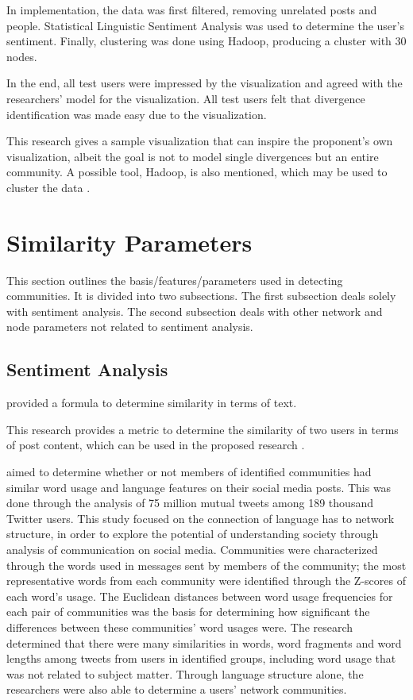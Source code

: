 In implementation, the data was first filtered, removing unrelated posts and people. Statistical Linguistic Sentiment Analysis was used to determine the user’s sentiment. Finally, clustering was done using Hadoop, producing a cluster with 30 nodes. 

In the end, all test users were impressed by the visualization and agreed with the researchers’ model for the visualization. All test users felt that divergence identification was made easy due to the visualization. 

This research gives a sample visualization that can inspire the proponent’s own visualization, albeit the goal is not to model single divergences but an entire community. A possible tool, Hadoop, is also mentioned, which may be used to cluster the data \cite{Cao:2015}.

\section{Similarity Parameters}
This section outlines the basis/features/parameters used in detecting communities. It is divided into two subsections. The first subsection deals solely with sentiment analysis. The second subsection deals with other network and node parameters not related to sentiment analysis. 

\subsection{Sentiment Analysis}

 provided a formula to determine similarity in terms of text. 

This research provides a metric to determine the similarity of two users in terms of post content, which can be used in the proposed research \cite{Zhang:2012}.

 aimed to determine whether or not members of identified communities had similar word usage and language features on their social media posts. This was done through the analysis of 75 million mutual tweets among 189 thousand Twitter users. This study focused on the connection of language has to network structure, in order to explore the potential of understanding society through analysis of communication on social media. Communities were characterized through the words used in messages sent by members of the community; the most representative words from each community were identified through the Z-scores of each word’s usage. The Euclidean distances between word usage frequencies for each pair of communities was the basis for determining how significant the differences between these communities’ word usages were. The research determined that there were many similarities in words, word fragments and word lengths among tweets from users in identified groups, including word usage that was not related to subject matter. Through language structure alone, the researchers were also able to determine a users' network communities.

